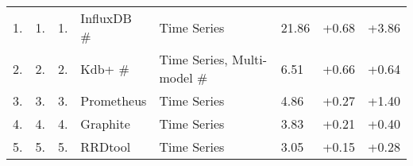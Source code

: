 \begin{table}[htbp]
\begin{tabular}{@{}llllllll@{}}
1.                                                                              & 1.                                                                              & 1.                                                                              & InfluxDB \#                                        & Time Series                                                  & 21.86                                                                           & +0.68                                                                           & +3.86                                                                           \\
2.                                                                              & 2.                                                                              & 2.                                                                              & Kdb+ \#                                            & Time Series, Multi-model \#                                  & 6.51                                                                            & +0.66                                                                           & +0.64                                                                           \\
3.                                                                              & 3.                                                                              & 3.                                                                              & Prometheus                                         & Time Series                                                  & 4.86                                                                            & +0.27                                                                           & +1.40                                                                           \\
4.                                                                              & 4.                                                                              & 4.                                                                              & Graphite                                           & Time Series                                                  & 3.83                                                                            & +0.21                                                                           & +0.40                                                                           \\
5.                                                                              & 5.                                                                              & 5.                                                                              & RRDtool                                            & Time Series                                                  & 3.05                                                                            & +0.15                                                                           & +0.28                                                                           \\

\end{tabular}
\end{table}
